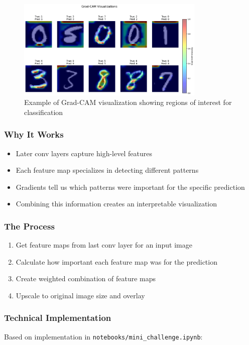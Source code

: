 \documentclass{article}
\begin{document}
\begin{figure}[h]
    \centering
    \includegraphics[width=0.8\textwidth]{images/grad_cam.png}
    \caption{Example of Grad-CAM visualization showing regions of interest for classification}
    \label{fig:grad_cam}
\end{figure}

\subsubsection{Why It Works}
\begin{itemize}
    \item Later conv layers capture high-level features
    \item Each feature map specializes in detecting different patterns
    \item Gradients tell us which patterns were important for the specific prediction
    \item Combining this information creates an interpretable visualization
\end{itemize}

\subsubsection{The Process}
\begin{enumerate}
    \item Get feature maps from last conv layer for an input image
    \item Calculate how important each feature map was for the prediction
    \item Create weighted combination of feature maps
    \item Upscale to original image size and overlay
\end{enumerate}

\subsubsection{Technical Implementation}
Based on implementation in \texttt{notebooks/mini\_challenge.ipynb}:
\end{document}

